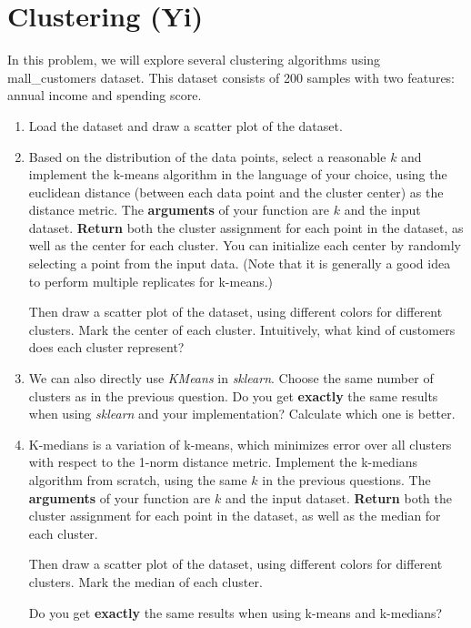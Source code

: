 \documentclass{exam}
\begin{document}
\section{Clustering (Yi)}
In this problem, we will explore several clustering algorithms using mall\_customers dataset. This dataset consists of 200 samples with two features: annual income and spending score. 
\begin{enumerate}
    \item Load the dataset and draw a scatter plot of the dataset.
    \item Based on the distribution of the data points, select a reasonable $k$ and implement the k-means algorithm in the language of your choice, using the euclidean distance (between each data point and the cluster center) as the distance metric. The \textbf{arguments} of your function are $k$ and the input dataset. \textbf{Return} both the cluster assignment for each point in the dataset, as well as the center for each cluster. You can initialize each center by randomly selecting a point from the input data. (Note that it is generally a good idea to perform multiple replicates for k-means.)
    \par Then draw a scatter plot of the dataset, using different colors for different clusters. Mark the center of each cluster. Intuitively, what kind of customers does each cluster represent? 
    \item We can also directly use \textit{KMeans} in \textit{sklearn}. Choose the same number of clusters as in the previous question. Do you get \textbf{exactly} the same results when using \textit{sklearn} and your implementation? Calculate which one is better.
    \item K-medians is a variation of k-means, which minimizes error over all clusters with respect to the 1-norm distance metric. Implement the k-medians algorithm from scratch, using the same $k$ in the previous questions. The \textbf{arguments} of your function are $k$ and the input dataset. \textbf{Return} both the cluster assignment for each point in the dataset, as well as the median for each cluster. 
    \par Then draw a scatter plot of the dataset, using different colors for different clusters. Mark the median of each cluster.
    \par Do you get \textbf{exactly} the same results when using k-means and k-medians?
\end{enumerate}
\end{document}
